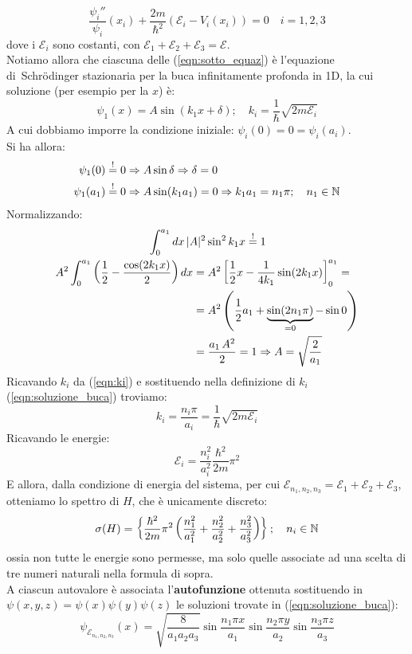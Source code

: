 \documentclass[../../FisicaTeorica.tex]{subfiles}
\begin{document}
\begin{equation}
\frac{\psi_i''}{\psi_i}(x_i)+\frac{2m}{\hbar^2}(\mathcal{E}_i-V_i(x_i))=0\quad i=1,2,3
\label{eqn:sotto_equaz}
\end{equation}
dove i $\mathcal{E}_i$ sono costanti, con $\mathcal{E}_1+\mathcal{E}_2 +\mathcal{E}_3 = \mathcal{E}$.\\
Notiamo allora che ciascuna delle (\ref{eqn:sotto_equaz}) è l'equazione di\ Schrödinger stazionaria per la buca infinitamente profonda in 1D, la cui soluzione (per esempio per la $x$) è:
\begin{equation}
\psi_1(x)=A\sin(k_1 x+\delta);\quad k_i = \frac{1}{\hbar}\sqrt{2m\mathcal{E}_i}
\label{eqn:soluzione_buca}
\end{equation}
A cui dobbiamo imporre la condizione iniziale: $\psi_i(0)=0=\psi_i(a_i)$.\\
Si ha allora:
\begin{align}
    \nonumber \psi_1(0) &\overset{!}{=} 0 \Rightarrow A\sin\delta\Rightarrow \delta=0\\
    \psi_1(a_1) &\overset{!}{=} 0 \Rightarrow A\sin(k_1 a_1) = 0 \Rightarrow k_1 a_1 = n_1 \pi; \quad n_1 \in \mathbb{N}
    \label{eqn:ki}
\end{align}
Normalizzando:
\begin{align*}
\span \int_0^{a_1} dx\,|A|^2 \sin^2 k_1 x \overset{!}{=} 1\\
A^2 \int_0^{a_1} \left(\frac{1}{2}-\frac{\cos(2k_1 x)}{2}\right)dx &= A^2 \left[
\frac{1}{2}x-\frac{1}{4k_1}\sin(2k_1 x)
\right ]_0^{a_1} = \\
&= A^2\left(\frac{1}{2}a_1 + \underbrace{\sin(2n_1\pi)}_{=0} -\sin 0\right )\\ & =  \frac{a_1\, A^2}{2} = 1 \Rightarrow A=\sqrt{\frac{2}{a_1}}
\end{align*}
Ricavando $k_i$ da (\ref{eqn:ki}) e sostituendo nella definizione di $k_i$ (\ref{eqn:soluzione_buca}) troviamo:
\[
k_i = \frac{n_i \pi}{a_i} = \frac{1}{\hbar}\sqrt{2m\mathcal{E}_i}
\]
Ricavando le energie:
\[
\mathcal{E}_i = \frac{n_i^2}{a_i^2}\frac{\hbar^2}{2m}\pi^2
\]
E allora, dalla condizione di energia del sistema, per cui $\mathcal{E}_{n_1,n_2,n_3}=\mathcal{E}_1+\mathcal{E}_2+\mathcal{E}_3$, otteniamo lo spettro di $H$, che è unicamente discreto:
\[
\sigma(H)=\left \{
\frac{\hbar^2}{2m}\pi^2 \left(\frac{n_1^2}{a_1^2}+\frac{n_2^2}{a_2^2}+\frac{n_3^2}{a_3^2}\right)
\right \}; \quad n_i \in \mathbb{N}
\]
ossia non tutte le energie sono permesse, ma solo quelle associate ad una scelta di tre numeri naturali nella formula di sopra.\\
A ciascun autovalore è associata l'\textbf{autofunzione} ottenuta sostituendo in $\psi(x,y,z)=\psi(x)\psi(y)\psi(z)$ le soluzioni trovate in (\ref{eqn:soluzione_buca}):
\[
\psi_{\mathcal{E}_{n_1,n_2,n_3}}(x)=\sqrt{\frac{8}{a_1 a_2 a_3}}\sin \frac{n_1 \pi x}{a_1}\sin \frac{n_2 \pi y}{a_2}\sin \frac{n_3 \pi z }{a_3}
\]
\end{document}
